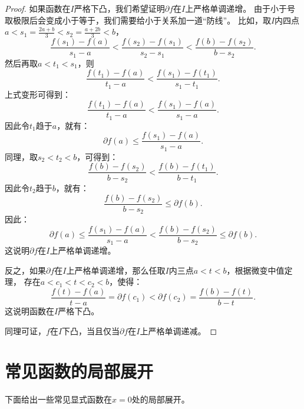 \documentclass[12pt,UTF8,fontset=none]{ctexbook}
\begin{document}
\begin{appendix}
\begin{proof}
    如果函数在$I$严格下凸，我们希望证明$\partial f$在$I$上严格单调递增。
    由于小于号取极限后会变成小于等于，我们需要给小于关系加一道“防线”。
    比如，取$I$内四点$a < s_1 = \frac{2a + b}{3} < s_2 = \frac{a + 2b}{3} < b$，
    $$ \frac{f(s_1) - f(a)}{s_1 - a} < \frac{f(s_2) - f(s_1)}{s_2 - s_1} < \frac{f(b) - f(s_2)}{b - s_2}. $$
    然后再取$a < t_1 < s_1$，则
    $$ \frac{f(t_1) - f(a)}{t_1 - a} < \frac{f(s_1) - f(t_1)}{s_1 - t_1}. $$
    上式变形可得到：
    $$ \frac{f(t_1) - f(a)}{t_1 - a} < \frac{f(s_1) - f(a)}{s_1 - a}. $$
    因此令$t_1$趋于$a$，就有：
    $$ \partial f(a) \leqslant \frac{f(s_1) - f(a)}{s_1 - a}.$$
    同理，取$s_2 < t_2 < b$，可得到：
    $$ \frac{f(b) - f(s_2)}{b - s_2} < \frac{f(b) - f(t_1)}{b - t_1}. $$
    因此令$t_2$趋于$b$，就有：
    $$ \frac{f(b) - f(s_2)}{b - s_2} \leqslant \partial f(b).$$
    因此：
    $$ \partial f(a) \leqslant \frac{f(s_1) - f(a)}{s_1 - a} < \frac{f(b) - f(s_2)}{b - s_2} \leqslant \partial f(b).$$
    这说明$\partial f$在$I$上严格单调递增。
    
    反之，如果$\partial f$在$I$上严格单调递增，那么任取$I$内三点$a < t < b$，根据微变中值定理，
    存在$a < c_1 < t < c_2 < b$，使得：
    $$ \frac{f(t) - f(a)}{t - a} = \partial f(c_1) < \partial f(c_2) = \frac{f(b) - f(t)}{b - t}. $$
    这说明函数在$I$严格下凸。

    同理可证，$f$在$I$下凸，当且仅当$\partial f$在$I$上严格单调递减。

\end{proof}

\section{常见函数的局部展开}

下面给出一些常见显式函数在$x = 0$处的局部展开。


\end{appendix}
\end{document}
